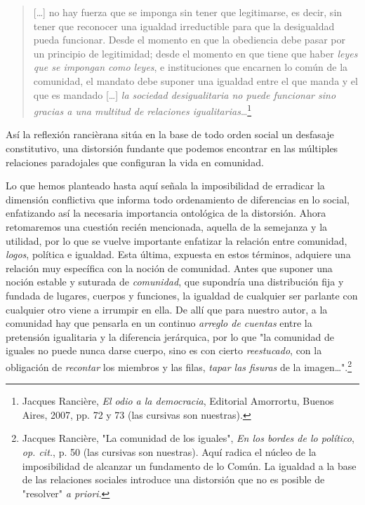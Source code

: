 \documentclass{book}
\begin{document}
\begin{quote}
{[}\ldots{]} no hay fuerza que se imponga sin tener que legitimarse, es
decir, sin tener que reconocer una igualdad irreductible para que la
desigualdad pueda funcionar. Desde el momento en que la obediencia debe
pasar por un principio de legitimidad; desde el momento en que tiene que
haber \emph{leyes que se impongan como leyes}, e instituciones que
encarnen lo común de la comunidad, el mandato debe suponer una igualdad
entre el que manda y el que es mandado {[}\ldots{]} \emph{la sociedad
desigualitaria no puede funcionar sino gracias a una multitud de
relaciones igualitarias}\ldots{}\footnote{Jacques Rancière, \emph{El
  odio a la democracia}, Editorial Amorrortu, Buenos Aires, 2007, pp. 72
  y 73 (las cursivas son nuestras).}
\end{quote}

Así la reflexión rancièrana sitúa en la base de todo orden social un
desfasaje constitutivo, una distorsión fundante que podemos encontrar en
las múltiples relaciones paradojales que configuran la vida en
comunidad.

Lo que hemos planteado hasta aquí señala la imposibilidad de erradicar
la dimensión conflictiva que informa todo ordenamiento de diferencias en
lo social, enfatizando así la necesaria importancia ontológica de la
distorsión. Ahora retomaremos una cuestión recién mencionada, aquella de
la semejanza y la utilidad, por lo que se vuelve importante enfatizar la
relación entre comunidad, \emph{logos}, política e igualdad. Esta
última, expuesta en estos términos, adquiere una relación muy específica
con la noción de comunidad. Antes que suponer una noción estable y
suturada de \emph{comunidad}, que supondría una distribución fija y
fundada de lugares, cuerpos y funciones, la igualdad de cualquier ser
parlante con cualquier otro viene a irrumpir en ella. De allí que para
nuestro autor, a la comunidad hay que pensarla en un continuo
\emph{arreglo de cuentas} entre la pretensión igualitaria y la
diferencia jerárquica, por lo que "la comunidad de iguales no puede
nunca darse cuerpo, sino es con cierto \emph{reestucado}, con la
obligación de \emph{recontar} los miembros y las filas, \emph{tapar las
fisuras} de la imagen\ldots".\footnote{Jacques Rancière, "La comunidad
  de los iguales", \emph{En los bordes de lo político}, \emph{op. cit.},
  p. 50 (las cursivas son nuestras). Aquí radica el núcleo de la
  imposibilidad de alcanzar un fundamento de lo Común. La igualdad a la
  base de las relaciones sociales introduce una distorsión que no es
  posible de "resolver" \emph{a priori}.}
\end{document}
